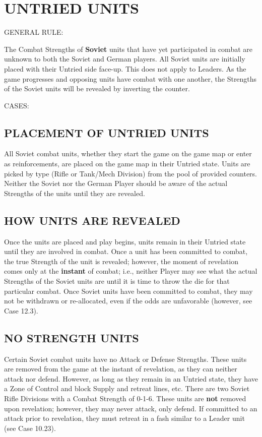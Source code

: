 \section{UNTRIED UNITS}

GENERAL RULE:

The Combat Strengths of \textbf{Soviet} units that have yet participated in combat are unknown to both the Soviet and German players. All Soviet units are initially placed with their Untried side face-up. This does not apply to Leaders. As the game progresses and opposing units have combat with one another, the Strengths of the Soviet units will be revealed by inverting the counter.

CASES:

\begin{flushleft}
  \subsection{PLACEMENT OF UNTRIED UNITS}
\end{flushleft}

All Soviet combat units, whether they start the game on the game map or enter as reinforcements, are placed on the game map in their Untried state. Units are picked by type (Rifle or Tank/Mech Division) from the pool of provided counters. Neither the Soviet nor the German Player should be aware of the actual Strengths of the units until they are revealed.

\subsection{HOW UNITS ARE REVEALED}

Once the units are placed and play begins, units remain in their Untried state until they are involved in combat. Once a unit has been committed to combat, the true Strength of the unit is revealed; however, the moment of revelation comes only at the \textbf{instant} of combat; i.e., neither Player may see what the actual Strengths of the Soviet units are until it is time to throw the die for that particular combat. Once Soviet units have been committed to combat, they may not be withdrawn or re-allocated, even if the odds are unfavorable (however, see Case 12.3).

\subsection{NO STRENGTH UNITS}

Certain Soviet combat units have no Attack or Defense Strengths. These units are removed from the game at the instant of revelation, as they can neither attack nor defend. However, as long as they remain in an Untried state, they have a Zone of Control and block Supply and retreat lines, etc. There are two Soviet Rifle Divisions with a Combat Strength of 0-1-6. These units are \textbf{not} removed upon revelation; however, they may never attack, only defend. If committed to an attack prior to revelation, they must retreat in a fash similar to a Leader unit (see Case 10.23).

